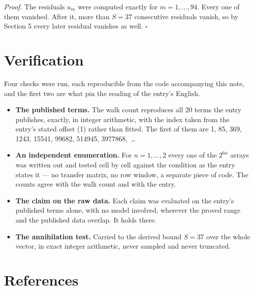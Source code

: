 \documentclass[11pt]{article}
\theoremstyle{definition}
\begin{document}
{\itshape Proof.} The residuals $u_m$ were computed exactly for $m = 1,\dots,94$. Every one of them vanished. After it, more than $S = 37$ consecutive residuals vanish, so by Section 5 every later residual vanishes as well. $\square$

\section{Verification}

Four checks were run, each reproducible from the code accompanying this note, and the first two are what pin the reading of the entry's English.

\begin{itemize}

\item {\bfseries The published terms.} The walk count reproduces all 20 terms the entry publishes, exactly, in integer arithmetic, with the index taken from the entry's stated offset (1) rather than fitted. The first of them are 1, 85, 369, 1243, 15541, 99682, 514945, 3977868,~\dots

\item {\bfseries An independent enumeration.} For $n = 1,\dots,2$ every one of the $2^{6n}$ arrays was written out and tested cell by cell against the condition as the entry states it --- no transfer matrix, no row window, a separate piece of code. The counts agree with the walk count and with the entry.

\item {\bfseries The claim on the raw data.} Each claim was evaluated on the entry's published terms alone, with no model involved, wherever the proved range and the published data overlap. It holds there.

\item {\bfseries The annihilation test.} Carried to the derived bound $S = 37$ over the whole vector, in exact integer arithmetic, never sampled and never truncated.

\end{itemize}

\section{References}
\end{document}
